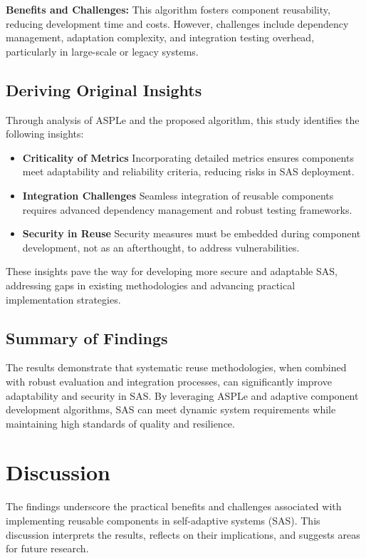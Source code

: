 \documentclass[a4paper,10pt]{article}
\begin{document}
\textbf{Benefits and Challenges:} This algorithm fosters component reusability, reducing development time and costs. However, challenges include dependency management, adaptation complexity, and integration testing overhead, particularly in large-scale or legacy systems.

\subsection{Deriving Original Insights}

Through analysis of ASPLe and the proposed algorithm, this study identifies the following insights:
\begin{itemize}
    \item \textbf{Criticality of Metrics} Incorporating detailed metrics ensures components meet adaptability and reliability criteria, reducing risks in SAS deployment.
    \item \textbf{Integration Challenges} Seamless integration of reusable components requires advanced dependency management and robust testing frameworks.
    \item \textbf{Security in Reuse} Security measures must be embedded during component development, not as an afterthought, to address vulnerabilities.
\end{itemize}

These insights pave the way for developing more secure and adaptable SAS, addressing gaps in existing methodologies and advancing practical implementation strategies.

\subsection{Summary of Findings}

The results demonstrate that systematic reuse methodologies, when combined with robust evaluation and integration processes, can significantly improve adaptability and security in SAS. By leveraging ASPLe and adaptive component development algorithms, SAS can meet dynamic system requirements while maintaining high standards of quality and resilience.




\section{Discussion}

The findings underscore the practical benefits and challenges associated with implementing reusable components in self-adaptive systems (SAS). This discussion interprets the results, reflects on their implications, and suggests areas for future research.
\end{document}
